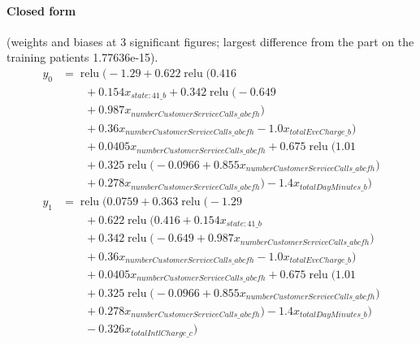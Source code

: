 \documentclass[a4paper,10pt]{article}
\newif\ifreviewmarks
\newcommand{\reviewrule}{\noindent{\color{BrickRed}\rule{\linewidth}{0.8pt}}}
\newenvironment{drafted}[1][]{%
  \ifreviewmarks\par\addvspace{\medskipamount}\reviewrule\par\nopagebreak
  \noindent{\color{BrickRed}\sffamily\footnotesize\textbf{Thesis Draft}\quad #1\hfill review}\par\nopagebreak\smallskip\fi}{%
  \ifreviewmarks\par\smallskip\noindent{\color{BrickRed}\sffamily\footnotesize end of thesis draft}\par\nopagebreak\reviewrule\par\medskip\fi}
\begin{document}
\begin{drafted}[plain-language layer: churn100-s2-c1]
\paragraph{Closed form} {\footnotesize(weights and biases at 3 significant figures; largest difference from the part on the training patients 1.77636e-15).}
{\small\begingroup\allowdisplaybreaks
\begin{align*}
y_{0} &= \operatorname{relu}\bigl(-1.29 + 0.622 \operatorname{relu}\bigl(0.416 \\
&\qquad + 0.154 x_{state:41\_b} + 0.342 \operatorname{relu}\bigl(-0.649 \\
&\qquad + 0.987 x_{numberCustomerServiceCalls\_abcfh}\bigr) \\
&\qquad + 0.36 x_{numberCustomerServiceCalls\_abcfh} - 1.0 x_{totalEveCharge\_b}\bigr) \\
&\qquad + 0.0405 x_{numberCustomerServiceCalls\_abcfh} + 0.675 \operatorname{relu}\bigl(1.01 \\
&\qquad + 0.325 \operatorname{relu}\bigl(-0.0966 + 0.855 x_{numberCustomerServiceCalls\_abcfh}\bigr) \\
&\qquad + 0.278 x_{numberCustomerServiceCalls\_abcfh}\bigr) - 1.4 x_{totalDayMinutes\_b}\bigr) \\
y_{1} &= \operatorname{relu}\bigl(0.0759 + 0.363 \operatorname{relu}\bigl(-1.29 \\
&\qquad + 0.622 \operatorname{relu}\bigl(0.416 + 0.154 x_{state:41\_b} \\
&\qquad + 0.342 \operatorname{relu}\bigl(-0.649 + 0.987 x_{numberCustomerServiceCalls\_abcfh}\bigr) \\
&\qquad + 0.36 x_{numberCustomerServiceCalls\_abcfh} - 1.0 x_{totalEveCharge\_b}\bigr) \\
&\qquad + 0.0405 x_{numberCustomerServiceCalls\_abcfh} + 0.675 \operatorname{relu}\bigl(1.01 \\
&\qquad + 0.325 \operatorname{relu}\bigl(-0.0966 + 0.855 x_{numberCustomerServiceCalls\_abcfh}\bigr) \\
&\qquad + 0.278 x_{numberCustomerServiceCalls\_abcfh}\bigr) - 1.4 x_{totalDayMinutes\_b}\bigr) \\
&\qquad - 0.326 x_{totalIntlCharge\_c}\bigr)
\end{align*}\endgroup}


\end{drafted}
\end{document}

